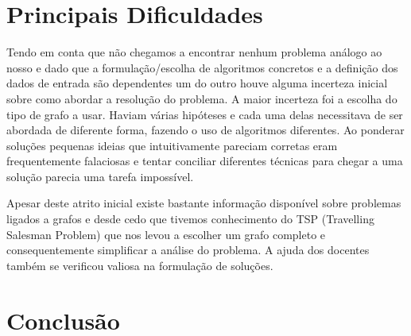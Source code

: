 \documentclass[12pt,a4paper,reqno]{report}
\numberwithin{figure}{section}
\numberwithin{equation}{section}
\begin{document}
\chapter{Principais Dificuldades}

Tendo em conta que não chegamos a encontrar nenhum problema análogo ao nosso e
dado que a formulação/escolha de algoritmos concretos e a definição dos dados de
entrada são dependentes um do outro houve alguma incerteza inicial sobre como
abordar a resolução do problema. A maior incerteza foi a escolha do tipo de
grafo a usar. Haviam várias hipóteses e cada uma delas necessitava de ser
abordada de diferente forma, fazendo o uso de algoritmos diferentes. Ao
ponderar soluções pequenas ideias que intuitivamente pareciam corretas eram
frequentemente falaciosas e tentar conciliar diferentes técnicas para chegar a
uma solução parecia uma tarefa impossível.

Apesar deste atrito inicial existe bastante informação disponível sobre problemas ligados a grafos e desde cedo que tivemos conhecimento do TSP (Travelling Salesman Problem) que nos levou a escolher um grafo completo e consequentemente simplificar a análise do problema. A ajuda dos docentes também se verificou valiosa na formulação de soluções.


\chapter{Conclusão}
\end{document}
